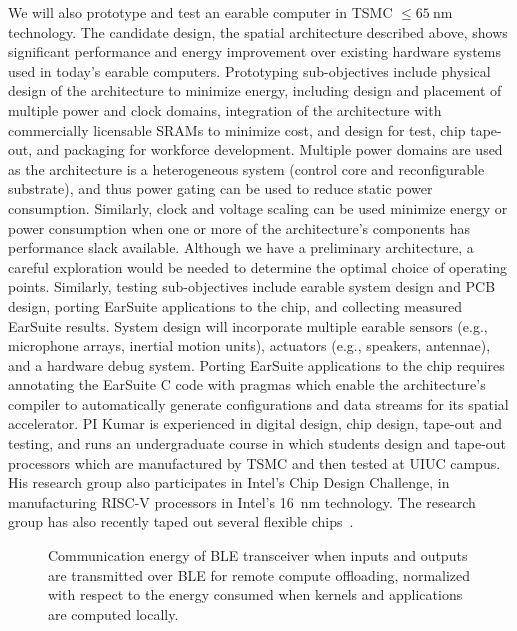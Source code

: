 We will also prototype and test an earable computer in TSMC \(\leq
\SI{65}{\nano\meter}\) technology. The candidate design, the spatial
architecture described above, shows significant performance and energy
improvement over existing hardware systems used in today's earable computers.
Prototyping sub-objectives include physical design of the architecture to
minimize energy, including design and placement of multiple power and clock
domains, integration of the architecture with commercially licensable SRAMs to
minimize cost, and design for test, chip tape-out, and packaging for workforce
development.  Multiple power domains are used as the architecture is a
heterogeneous system (control core and reconfigurable substrate), and thus
power gating can be used to reduce static power consumption. Similarly, clock
and voltage scaling can be used minimize energy or power consumption when one
or more of the architecture's components has performance slack available.
Although we have a preliminary architecture, a careful exploration would be
needed to determine the optimal choice of operating points.   Similarly,
testing sub-objectives include earable system design and PCB design, porting
EarSuite applications to the chip, and collecting measured EarSuite results.
System design will incorporate multiple earable sensors (e.g., microphone
arrays, inertial motion units), actuators (e.g., speakers, antennae), and a
hardware debug system. Porting EarSuite applications to the chip requires
annotating the EarSuite C code with pragmas which enable the architecture's
compiler to automatically generate configurations and data streams for its
spatial accelerator. PI Kumar is experienced in digital design, chip design,
tape-out and testing, and runs an undergraduate course in which students design
and tape-out processors which are manufactured by TSMC and then tested at UIUC
campus. His research group also participates in Intel's Chip Design Challenge,
in manufacturing RISC-V processors in Intel's \SI{16}{\nano\meter} technology.
The research group has also recently taped out several flexible
chips~\cite{bleier2022flexicores, Bleier_2023}.


\begin{figure}[htbp]
  \centering
    \subfloat{
        {}
        }
    \subfloat{
        {}
    }
    \caption{ Communication energy of BLE transceiver when inputs and outputs
    are transmitted over BLE for remote compute offloading, normalized with
    respect to the energy consumed when kernels and applications are
    computed locally.}
  \label{fig:ble}
\end{figure}

